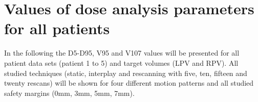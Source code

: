 \section{Values of dose analysis parameters for all patients}
\label{app:human:mmt}
 In the following the D5-D95, V95 and V107 values will be presented for all patient data sets (patient 1 to 5) and target volumes (LPV 
 and RPV). All studied techniques (static, interplay and rescanning with five, ten, fifteen and twenty rescans) will be shown for 
 four different motion patterns and all studied safety margins (0mm, 3mm, 5mm, 7mm). 
                         
\newpage

\thispagestyle{realempty}


\vspace*{-2cm}

